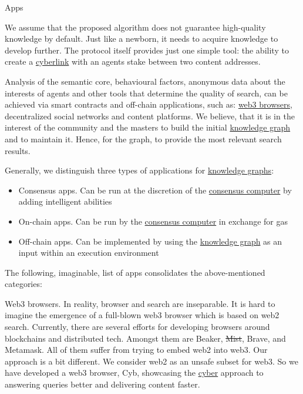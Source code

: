 \documentclass[8pt,oneside]{amsart}
\makeatletter
\renewcommand\subsection{\@startsection{subsection}
                                    {2}{\z@}
                                    {-3.25ex\@plus -1ex \@minus -.2ex}
                                    {0ex \@plus .2ex}
                                    {\play\Large}
                        }
\newcommand{\titleSection}[1]{\subsection{#1}}
\makeatother
\begin{document}
\titleSection{Apps}\label{apps}

We assume that the proposed algorithm does not guarantee high-quality knowledge by default. Just like a newborn, it needs to acquire knowledge to develop further. The protocol itself provides just one simple tool: the ability to create a {\hyperref[cyberlinks]{cyberlink}} with an agents stake between two content addresses.

Analysis of the semantic core, behavioural factors, anonymous data about the interests of agents and other tools that determine the quality of search, can be achieved via smart contracts and off-chain applications, such as: {\hyperref[browzers]{web3 browsers}}, decentralized social networks and content platforms. We believe, that it is in the interest of the community and the masters to build the initial {\hyperref[knowledge-graph]{knowledge graph}} and to maintain it. Hence, for the graph, to provide the most relevant search results.

Generally, we distinguish three types of applications for {\hyperref[knowledge-graph]{knowledge graphs}}:

\begin{itemize}
\item Consensus apps. Can be run at the discretion of the {\hyperref[consensus-computer]{consensus computer}} by adding intelligent abilities
\item On-chain apps. Can be run by the {\hyperref[consensus-computer]{consensus computer}} in exchange for gas
\item Off-chain apps. Can be implemented by using the {\hyperref[knowledge-graph]{knowledge graph}} as an input within an execution environment
\end{itemize}

The following, imaginable, list of apps consolidates the above-mentioned categories:

Web3 browsers. In reality, browser and search are inseparable. It is hard to imagine the emergence of a full-blown web3 browser which is based on web2 search. Currently, there are several efforts for developing browsers around blockchains and distributed tech. Amongst them are Beaker, \sout{Mist}, Brave, and Metamask. All of them suffer from trying to embed web2 into web3. Our approach is a bit different. We consider web2 as an unsafe subset for web3. So we have developed a web3 browser, Cyb, showcasing the {\hyperref[cyber]{cyber}} approach to answering queries better and delivering content faster.
\end{document}
